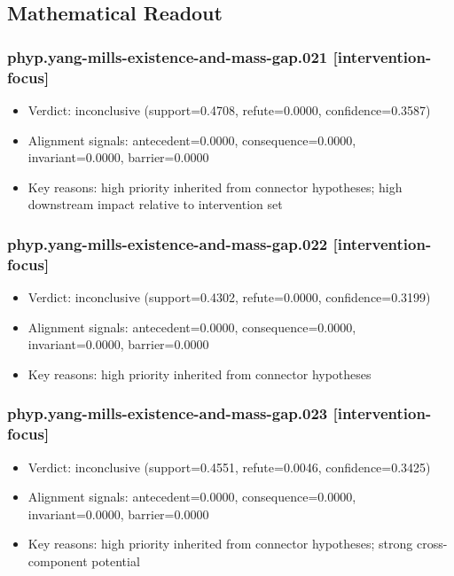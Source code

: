 \documentclass[
]{article}
\providecommand{\tightlist}{%
  \setlength{\itemsep}{0pt}\setlength{\parskip}{0pt}}
\begin{document}
\subsection{Mathematical Readout}\label{mathematical-readout}

\subsubsection{phyp.yang-mills-existence-and-mass-gap.021
{[}intervention-focus{]}}\label{phypyang-mills-existence-and-mass-gap021-intervention-focus}

\begin{itemize}
\tightlist
\item
  Verdict: inconclusive (support=0.4708, refute=0.0000,
  confidence=0.3587)
\item
  Alignment signals: antecedent=0.0000, consequence=0.0000,
  invariant=0.0000, barrier=0.0000
\item
  Key reasons: high priority inherited from connector hypotheses; high
  downstream impact relative to intervention set
\end{itemize}

\subsubsection{phyp.yang-mills-existence-and-mass-gap.022
{[}intervention-focus{]}}\label{phypyang-mills-existence-and-mass-gap022-intervention-focus}

\begin{itemize}
\tightlist
\item
  Verdict: inconclusive (support=0.4302, refute=0.0000,
  confidence=0.3199)
\item
  Alignment signals: antecedent=0.0000, consequence=0.0000,
  invariant=0.0000, barrier=0.0000
\item
  Key reasons: high priority inherited from connector hypotheses
\end{itemize}

\subsubsection{phyp.yang-mills-existence-and-mass-gap.023
{[}intervention-focus{]}}\label{phypyang-mills-existence-and-mass-gap023-intervention-focus}

\begin{itemize}
\tightlist
\item
  Verdict: inconclusive (support=0.4551, refute=0.0046,
  confidence=0.3425)
\item
  Alignment signals: antecedent=0.0000, consequence=0.0000,
  invariant=0.0000, barrier=0.0000
\item
  Key reasons: high priority inherited from connector hypotheses; strong
  cross-component potential
\end{itemize}
\end{document}
